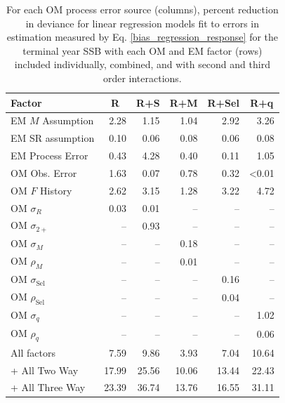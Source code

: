 \documentclass[
  12pt,
]{article}
\begin{document}
\begin{table}
\caption{For each OM process error source (columns), percent reduction in deviance for linear regression models fit to errors in estimation measured by Eq. \ref{bias_regression_response} for the terminal year SSB with each OM and EM factor (rows) included individually, combined, and with second and third order interactions.}\label{bias_SSB_PRD_table}
{\begin{center}
\begin{tabular}{lrrrrr}
\hline\hline
\multicolumn{1}{l}{Factor}&\multicolumn{1}{c}{R}&\multicolumn{1}{c}{R+S}&\multicolumn{1}{c}{R+M}&\multicolumn{1}{c}{R+Sel}&\multicolumn{1}{c}{R+q}\tabularnewline
\hline
EM $M$ Assumption& 2.28& 1.15& 1.04& 2.92& 3.26\tabularnewline
EM SR assumption& 0.10& 0.06& 0.08& 0.06& 0.08\tabularnewline
EM Process Error& 0.43& 4.28& 0.40& 0.11& 1.05\tabularnewline
OM Obs. Error& 1.63& 0.07& 0.78& 0.32&\textless  0.01\tabularnewline
OM $F$ History& 2.62& 3.15& 1.28& 3.22& 4.72\tabularnewline
OM $\sigma_R$& 0.03& 0.01&--&--&--\tabularnewline
OM $\sigma_{2+}$ &--& 0.93&--&--&--\tabularnewline
OM $\sigma_M$&--&--& 0.18&--&--\tabularnewline
OM $\rho_M$&--&--& 0.01&--&--\tabularnewline
OM $\sigma_{\text{Sel}}$&--&--&--& 0.16&--\tabularnewline
OM $\rho_{\text{Sel}}$&--&--&--& 0.04&--\tabularnewline
OM $\sigma_q$&--&--&--&--& 1.02\tabularnewline
OM $\rho_q$&--&--&--&--& 0.06\tabularnewline
All factors& 7.59& 9.86& 3.93& 7.04&10.64\tabularnewline
+ All Two Way&17.99&25.56&10.06&13.44&22.43\tabularnewline
+ All Three Way&23.39&36.74&13.76&16.55&31.11\tabularnewline
\hline
\end{tabular}\end{center}
}
\end{table}
\end{document}
